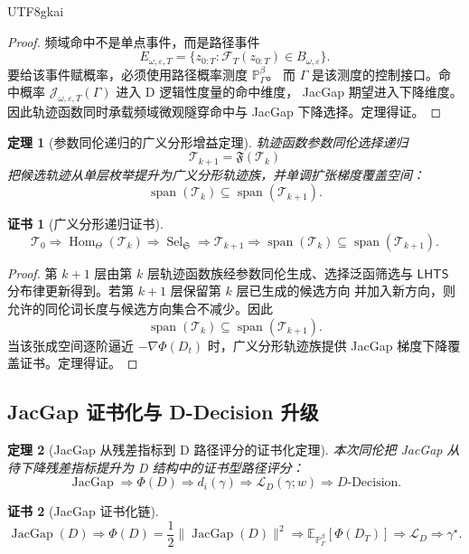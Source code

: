 \documentclass[12pt]{article}
\newtheorem{theorem}{定理}[section]
\newtheorem{Certificate}{证书}[section]
\newcommand{\LHTS}{\ensuremath{\mathsf{LHTS}}}
\newcommand{\E}{\mathbb E}
\DeclareMathOperator{\JacGap}{JacGap}
\DeclareMathOperator{\Span}{span}
\DeclareMathOperator{\Sel}{Sel}
\DeclareMathOperator{\Hom}{Hom}
\begin{document}
\begin{CJK*}{UTF8}{gkai}
\begin{proof}
频域命中不是单点事件，而是路径事件
\[
E_{\omega,\varepsilon,T}
=
\{z_{0:T}:\mathscr F_T(z_{0:T})\in B_{\omega,\varepsilon}\}.
\]
要给该事件赋概率，必须使用路径概率测度 \(\mathbb P_\Gamma^\beta\)。
而 \(\Gamma\) 是该测度的控制接口。命中概率
\(\mathcal J_{\omega,\varepsilon,T}(\Gamma)\) 进入 D 逻辑性度量的命中维度，
JacGap 期望进入下降维度。因此轨迹函数同时承载频域微观隧穿命中与 JacGap
下降选择。定理得证。
\end{proof}

\begin{theorem}[参数同伦递归的广义分形增益定理]
轨迹函数参数同伦选择递归
\[
\mathcal T_{k+1}=\mathfrak F(\mathcal T_k)
\]
把候选轨迹从单层枚举提升为广义分形轨迹族，并单调扩张梯度覆盖空间：
\[
\Span(\mathcal T_k)\subseteq\Span(\mathcal T_{k+1}).
\]
\end{theorem}

\begin{Certificate}[广义分形递归证书]
\[
\boxed{
\mathcal T_0
\Rightarrow
\Hom_\Theta(\mathcal T_k)
\Rightarrow
\Sel_{\mathfrak S}
\Rightarrow
\mathcal T_{k+1}
\Rightarrow
\Span(\mathcal T_k)\subseteq\Span(\mathcal T_{k+1}).
}
\]
\end{Certificate}

\begin{proof}
第 \(k+1\) 层由第 \(k\) 层轨迹函数族经参数同伦生成、选择泛函筛选与
\(\LHTS\) 分布律更新得到。若第 \(k+1\) 层保留第 \(k\) 层已生成的候选方向
并加入新方向，则允许的同伦词长度与候选方向集合不减少。因此
\[
\Span(\mathcal T_k)\subseteq\Span(\mathcal T_{k+1}).
\]
当该张成空间逐阶逼近 \(-\nabla\Phi(D_t)\) 时，广义分形轨迹族提供 JacGap
梯度下降覆盖证书。定理得证。
\end{proof}

\subsection{JacGap 证书化与 D-Decision 升级}
\label{subsec:jacgap-certification-d-decision-upgrade}

\begin{theorem}[JacGap 从残差指标到 D 路径评分的证书化定理]
本次同伦把 JacGap 从待下降残差指标提升为 D 结构中的证书型路径评分：
\[
\boxed{
\JacGap
\Rightarrow
\Phi(D)
\Rightarrow
d_i(\gamma)
\Rightarrow
\mathcal L_D(\gamma;w)
\Rightarrow
D\text{-Decision}.
}
\]
\end{theorem}

\begin{Certificate}[JacGap 证书化链]
\[
\boxed{
\JacGap(D)
\Rightarrow
\Phi(D)=\frac12\|\JacGap(D)\|^2
\Rightarrow
\E_{\mathbb P_\Gamma^\beta}[\Phi(D_T)]
\Rightarrow
\mathcal L_D
\Rightarrow
\gamma^\star.
}
\]
\end{Certificate}


\end{CJK*}
\end{document}
